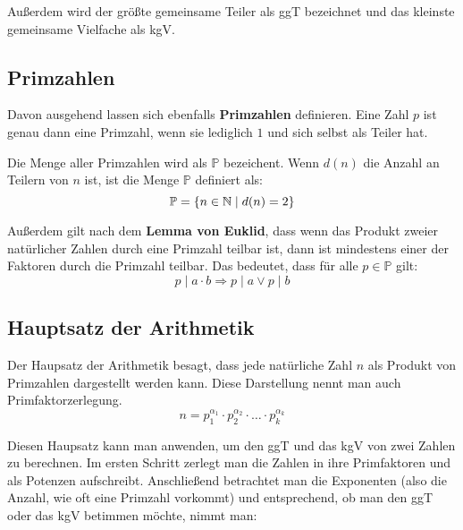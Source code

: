 \documentclass[11pt]{article}
\begin{document}
Außerdem wird der größte gemeinsame Teiler als ggT bezeichnet und das kleinste gemeinsame Vielfache als kgV.

\subsection{Primzahlen}
Davon ausgehend lassen sich ebenfalls \textbf{Primzahlen} definieren. Eine Zahl $p$ ist genau dann eine Primzahl, wenn sie
lediglich $1$ und sich selbst als Teiler hat.

Die Menge aller Primzahlen wird als $\mathbb{P}$ bezeichent. Wenn $d(n)$ die Anzahl an Teilern von $n$ ist, ist die Menge
$\mathbb{P}$ definiert als:
\[
  \mathbb{P}=\{n\in\mathbb{N} \mid d(n) = 2\}
\]

Außerdem gilt nach dem \textbf{Lemma von Euklid}, dass wenn das Produkt zweier natürlicher Zahlen durch eine Primzahl
teilbar ist, dann ist mindestens einer der Faktoren durch die Primzahl teilbar. Das bedeutet, dass für alle $p \in \mathbb{P}$
gilt:
\[
  p \mid a \cdot b \Longrightarrow p \mid a \lor p \mid b
\]

\subsection{Hauptsatz der Arithmetik}
Der Haupsatz der Arithmetik besagt, dass jede natürliche Zahl $n$ als Produkt von Primzahlen dargestellt werden kann.
Diese Darstellung nennt man auch Primfaktorzerlegung.
\[
  n = p_1^{\alpha_1} \cdot p_2^{\alpha_2} \cdot \ldots \cdot p_k^{\alpha_k}
\]


Diesen Haupsatz kann man anwenden, um den ggT und das kgV von zwei Zahlen zu berechnen. Im ersten Schritt zerlegt man die
Zahlen in ihre Primfaktoren und als Potenzen aufschreibt. Anschließend betrachtet man die Exponenten (also die Anzahl,
wie oft eine Primzahl vorkommt) und entsprechend, ob man den ggT oder das kgV betimmen möchte, nimmt man:
\ul{
}
\end{document}
